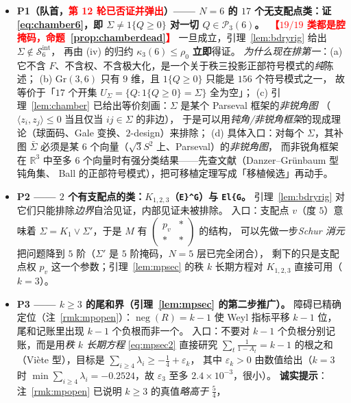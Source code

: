 \documentclass[UTF8,11pt]{ctexart}
\theoremstyle{definition}
\newcommand{\R}{\mathbb{R}}
\begin{document}
\begin{itemize}[leftmargin=1.6em,itemsep=3pt]
\item \textbf{P1（队首，\textcolor{red}{第 12 轮已否证并弹出}）—— $N=6$ 的 $17$ 个无支配点类：证 \eqref{eq:chamber6}，即 $\Sigma\ne1\{Q\ge0\}$ 对一切 $Q\in\mathcal P_3(6)$。\ \textcolor{red}{【$19/19$ 类都是腔掩码，命题~\ref{prop:chamberdead}】}}
一旦成立，引理~\ref{lem:bdryrig} 给出 $\Sigma\notin\mathcal S_6^{\mathrm{int}}$，
再由 (iv) 的归约 $\kappa_3(6)\le\rho_0$ \textbf{立即}得证。
\emph{为什么现在排第一}：(a) 它不含 $F$、不含权、不含极大化，是一个关于秩三投影正部符号模式的\emph{纯}陈述；
(b) $\mathrm{Gr}(3,6)$ 只有 $9$ 维，且 $1\{Q\ge0\}$ 只能是 $156$ 个符号模式之一，
故等价于「$17$ 个开集 $U_\Sigma=\{Q:1\{Q\ge0\}=\Sigma\}$ 全为空」；
(c) 引理~\ref{lem:chamber} 已给出等价刻画：$\Sigma$ 是某个 Parseval 框架的\emph{非锐角图}
（$\langle z_i,z_j\rangle\le0$ 当且仅当 $ij\in\Sigma$ 的非边），
于是可以用\emph{钝角/非锐角框架}的现成理论（球面码、Gale 变换、$2$-design）来排除；
(d) 具体入口：对每个 $\Sigma$，其补图 $\bar\Sigma$ 必须是某 $6$ 个向量（$\sqrt3S^2$ 上、Parseval）的\emph{非锐角图}，
而非锐角框架在 $\R^3$ 中至多 $6$ 个向量时有强分类结果——先查文献（Danzer--Grünbaum 型钝角集、
Ball 的正部符号模式），把可移植定理写成「移植候选」再动手。
\item \textbf{P2 —— $2$ 个有支配点的类：$K_{1,2,3}$（\texttt{E\}\^{}G}）与 \texttt{El\{G}。}
引理~\ref{lem:bdryrig} 对它们只能排除\emph{边界}自洽见证，内部见证未被排除。
入口：支配点 $v$（度 $5$）意味着 $\Sigma=K_1\vee\Sigma'$，于是 $M$ 有 $\begin{pmatrix}p_v&\ast\\ \ast&\ast\end{pmatrix}$ 的结构，
可以先做一步\emph{Schur 消元}把问题降到 $5$ 阶（$\Sigma'$ 是 $5$ 阶掩码，$N=5$ 层已完全闭合），
剩下的只是支配点权 $p_v$ 这一个参数；引理~\ref{lem:mpsec} 的秩 $k$ 长期方程对 $K_{1,2,3}$ 直接可用（$k=3$）。
\item \textbf{P3 —— $k\ge3$ 的尾和界（引理~\ref{lem:mpsec} 的第二步推广）。}
障碍已精确定位（注~\ref{rmk:mpopen}）：$\operatorname{neg}(R)=k-1$ 使 Weyl 指标平移 $k-1$ 位，
尾和记账里出现 $k-1$ 个负根而非一个。
入口：不要对 $k-1$ 个负根分别记账，而是用\emph{秩 $k$ 长期方程} \eqref{eq:mpsec2} 直接研究
$\sum_{t}\frac1{1-A_t}=k-1$ 的根之和（Viète 型），目标是 $\sum_{i\ge4}\lambda_i\ge-\frac14+\varepsilon_k$，
其中 $\varepsilon_k>0$ 由数值给出（$k=3$ 时 $\min\sum_{i\ge4}\lambda_i=-0.2524$，故 $\varepsilon_3$ 至多 $2.4\times10^{-3}$，很小）。
\textbf{诚实提示}：注~\ref{rmk:mpopen} 已说明 $k\ge3$ 的真值\emph{略高于} $\frac54$，

\end{itemize}
\end{document}

